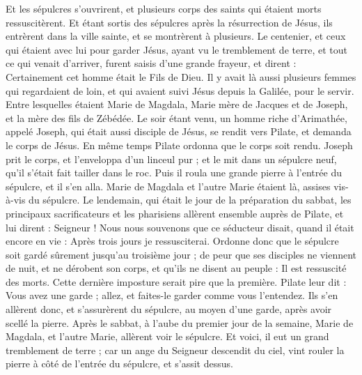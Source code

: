 \begin{multicols}{2}
Et les sépulcres s'ouvrirent, et plusieurs corps des saints qui étaient morts ressuscitèrent.
Et étant sortis des sépulcres après la résurrection de Jésus, ils entrèrent dans la ville sainte, et se montrèrent à plusieurs.
Le centenier, et ceux qui étaient avec lui pour garder Jésus, ayant vu le tremblement de terre, et tout ce qui venait d'arriver, furent saisis d’une grande frayeur, et dirent : Certainement cet homme était le Fils de Dieu.
Il y avait là aussi plusieurs femmes qui regardaient de loin, et qui avaient suivi Jésus depuis la Galilée, pour le servir.
Entre lesquelles étaient Marie de Magdala, Marie mère de Jacques et de Joseph, et la mère des fils de Zébédée.
Le soir étant venu, un homme riche d'Arimathée, appelé Joseph, qui était aussi disciple de Jésus,
se rendit vers Pilate, et demanda le corps de Jésus. En même temps Pilate ordonna que le corps soit rendu.
Joseph prit le corps, et l'enveloppa d'un linceul pur ;
et le mit dans un sépulcre neuf, qu'il s’était fait tailler dans le roc. Puis il roula une grande pierre à l'entrée du sépulcre, et il s'en alla.
Marie de Magdala et l’autre Marie étaient là, assises vis-à-vis du sépulcre.
Le lendemain, qui était le jour de la préparation du sabbat, les principaux sacrificateurs et les pharisiens allèrent ensemble auprès de Pilate,
et lui dirent : Seigneur ! Nous nous souvenons que ce séducteur disait, quand il était encore en vie : Après trois jours je ressusciterai.
Ordonne donc que le sépulcre soit gardé sûrement jusqu’au troisième jour ; de peur que ses disciples ne viennent de nuit, et ne dérobent son corps, et qu'ils ne disent au peuple : Il est ressuscité des morts. Cette dernière imposture serait pire que la première.
Pilate leur dit : Vous avez une garde ; allez, et faites-le garder comme vous l’entendez.
Ils s'en allèrent donc, et s’assurèrent du sépulcre, au moyen d’une garde, après avoir scellé la pierre.
\VerseOne{}Après le sabbat, à l’aube du premier jour de la semaine, Marie de Magdala, et l'autre Marie, allèrent voir le sépulcre.
Et voici, il eut un grand tremblement de terre ; car un ange du Seigneur descendit du ciel, vint rouler la pierre à côté de l'entrée du sépulcre, et s'assit dessus.

\end{multicols}
